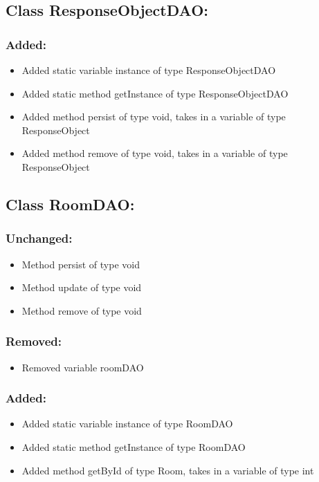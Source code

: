 \documentclass{article}
\begin{document}

\subsection{Class ResponseObjectDAO:}

\subsubsection{Added:}
\begin{itemize}
\item Added static variable instance of type ResponseObjectDAO
\item Added static method getInstance of type ResponseObjectDAO
\item Added method persist of type void, takes in a variable of type ResponseObject
\item Added method remove of type void, takes in a variable of type ResponseObject
\end{itemize}


\subsection{Class RoomDAO:}

\subsubsection{Unchanged:}
\begin{itemize}
\item Method persist of type void
\item Method update of type void
\item Method remove of type void
\end{itemize}

\subsubsection{Removed:}
\begin{itemize}
\item Removed variable roomDAO
\end{itemize}

\subsubsection{Added:}
\begin{itemize}
\item Added static variable instance of type RoomDAO
\item Added static method getInstance of type RoomDAO
\item Added method getById of type Room, takes in a variable of type int
\end{itemize}
\end{document}
